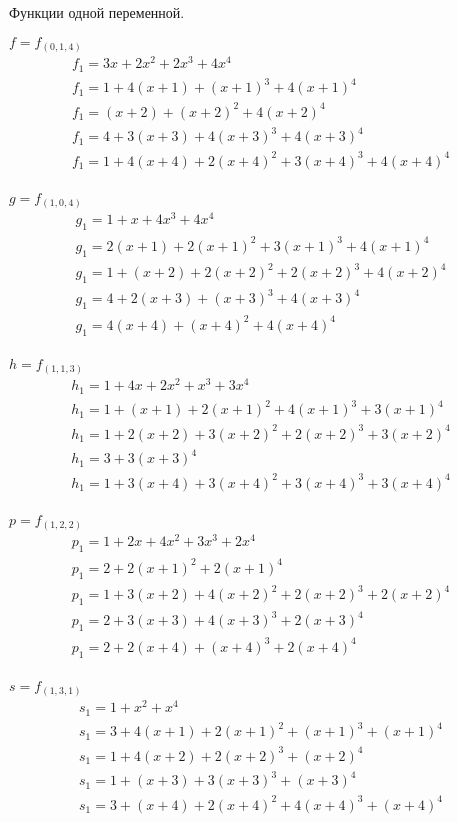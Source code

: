 \documentclass[bibliography=totoc, a4paper, 14pt]{extarticle}
\begin{document}
Функции одной переменной.

$f=f_{(0,1,4)}$
$$
\begin{array}{l}
f_1 = 3x + 2x^2 + 2x^3 + 4x^4 \\
f_1 = 1 + 4(x+1) + (x+1)^3 + 4(x+1)^4 \\
f_1 = (x+2) + (x+2)^2 + 4(x+2)^4 \\
f_1 = 4 + 3(x+3) + 4(x+3)^3 + 4(x+3)^4 \\
f_1 = 1 + 4(x+4) + 2(x+4)^2 + 3(x+4)^3 + 4(x+4)^4 \\
\end{array}
$$

$g=f_{(1,0,4)}$
$$
\begin{array}{l}
g_1 = 1 + x + 4x^3 + 4x^4 \\
g_1 = 2(x+1) + 2(x+1)^2 + 3(x+1)^3 + 4(x+1)^4 \\
g_1 = 1 + (x+2) + 2(x+2)^2 + 2(x+2)^3 + 4(x+2)^4 \\
g_1 = 4 + 2(x+3) + (x+3)^3 + 4(x+3)^4 \\
g_1 = 4(x+4) + (x+4)^2 + 4(x+4)^4 \\
\end{array}
$$

$h=f_{(1,1,3)}$
$$
\begin{array}{l}
h_1 = 1 + 4x + 2x^2 + x^3 + 3x^4 \\
h_1 = 1 + (x+1) + 2(x+1)^2 + 4(x+1)^3 + 3(x+1)^4 \\
h_1 = 1 + 2(x+2) + 3(x+2)^2 + 2(x+2)^3 + 3(x+2)^4 \\
h_1 = 3 + 3(x+3)^4 \\
h_1 = 1 + 3(x+4) + 3(x+4)^2 + 3(x+4)^3 + 3(x+4)^4 \\
\end{array}
$$

$p=f_{(1,2,2)}$
$$
\begin{array}{l}
p_1 = 1 + 2x + 4x^2 + 3x^3 + 2x^4 \\
p_1 = 2 + 2(x+1)^2 + 2(x+1)^4 \\
p_1 = 1 + 3(x+2) + 4(x+2)^2 + 2(x+2)^3 + 2(x+2)^4 \\
p_1 = 2 + 3(x+3) + 4(x+3)^3 + 2(x+3)^4 \\
p_1 = 2 + 2(x+4) + (x+4)^3 + 2(x+4)^4 \\
\end{array}
$$

$s=f_{(1,3,1)}$
$$
\begin{array}{l}
s_1 = 1 + x^2 + x^4 \\
s_1 = 3 + 4(x+1) + 2(x+1)^2 + (x+1)^3 + (x+1)^4 \\
s_1 = 1 + 4(x+2) + 2(x+2)^3 + (x+2)^4 \\
s_1 = 1 + (x+3) + 3(x+3)^3 + (x+3)^4 \\
s_1 = 3 + (x+4) + 2(x+4)^2 + 4(x+4)^3 + (x+4)^4 \\
\end{array}
$$
\end{document}
